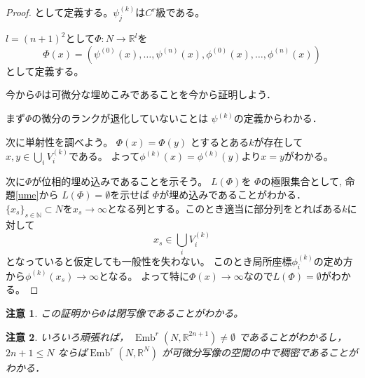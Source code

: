 \documentclass[leqno, a4paper, 12pt]{jsarticle}
\newtheorem*{rmk}{注意}
\newcommand{\nn}{\mathbb{N}}
\newcommand{\rr}{\mathbb{R}}
\DeclareMathOperator{\emb}{Emb}
\begin{document}
\begin{proof}
として定義する。$\psi_j^{(k)}$は$C^r$級である。

$l=(n+1)^2$として$\Phi:N\to \rr^l$を
\[
\Phi(x)=(\psi^{(0)}(x), \dots, \psi^{(n)}(x), \phi^{(0)}(x), \dots, \phi^{(n)}(x))
\]
として定義する。

今から$\Phi$は可微分な埋めこみであることを今から証明しよう．

まず$\Phi$の微分のランクが退化していないことは
$\psi^{(k)}$の定義からわかる．

次に単射性を調べよう。
$\Phi(x)=\Phi(y)$
とするとある$k$が存在して$x,y\in\bigcup_{i}V_i^{(k)} $である。
よって$\phi^{(k)}(x)=\phi^{(k)}(y)$より$x=y$がわかる。

次に$\Phi$が位相的埋め込みであることを示そう。
$L(\Phi)$を
$\Phi$の極限集合として, 
命題\ref{ume}から
$L(\Phi)=\emptyset$を示せば
$\Phi$が埋め込みであることがわかる．
$\{x_s\}_{s\in \nn}\subset N$を$x_s\to \infty$となる列とする。このとき適当に部分列をとればある$k$に対して
\[
x_s\in \bigcup_{i}V_i^{(k)}
\]
となっていると仮定しても一般性を失わない。
このとき局所座標$\phi_i^{(k)}$の定め方から$\phi^{(k)}(x_s)\to \infty$となる。
よって特に$\Phi(x)\to \infty$なので$L(\Phi)=\emptyset$がわかる。
\end{proof}

\begin{rmk}
この証明から$\Phi$は閉写像であることがわかる。
\end{rmk}

\begin{rmk}
いろいろ頑張れば，
$\emb^{r}(N, \rr^{2n+1})\neq \emptyset$
であることがわかるし，
$2n+1\le N$
ならば$\emb^{r}(N, \rr^{N})$
が可微分写像の空間の中で稠密であることがわかる．
\end{rmk}
\end{document}
